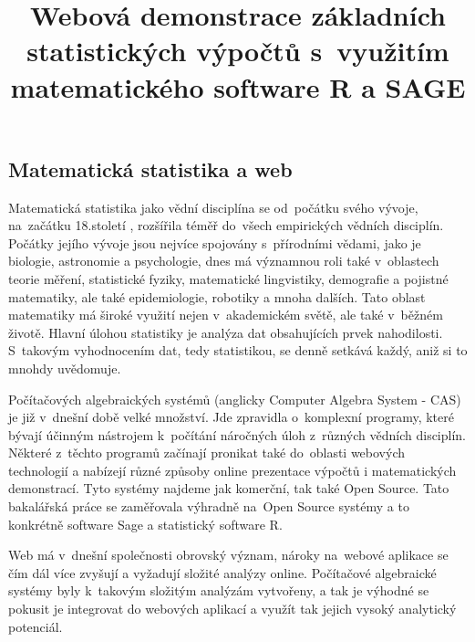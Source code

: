 \documentclass[thesis=B,czech]{FITthesis}[2012/06/26]
\title{Webová demonstrace základních statistických výpočtů s~využitím matematického software R a SAGE}
\begin{document}

\begin{introduction}
\subsection{Matematická statistika a web}
Matematická statistika jako vědní disciplína se od~počátku svého vývoje, na~začátku 18.století \cite{statistika}, rozšířila téměř do~všech empirických vědních disciplín. Počátky jejího vývoje jsou nejvíce spojovány s~přírodními vědami, jako je biologie, astronomie a psychologie, dnes má významnou roli také v~oblastech teorie měření, statistické fyziky, matematické lingvistiky, demografie a pojistné matematiky, ale také epidemiologie, robotiky a mnoha dalších. Tato oblast matematiky má široké využití nejen v~akademickém světě, ale také v~běžném životě. Hlavní úlohou statistiky je analýza dat obsahujících prvek nahodilosti. S~takovým vyhodnocením dat, tedy statistikou, se denně setkává každý, aniž si to mnohdy uvědomuje.  

Počítačových algebraických systémů (anglicky Computer Algebra System - CAS) je již v~dnešní době velké množství. Jde zpravidla o~komplexní programy, které bývají účinným nástrojem k~počítání náročných úloh z~různých vědních disciplín. Některé z~těchto programů začínají pronikat také do~oblasti webových technologií a nabízejí různé způsoby online prezentace výpočtů i matematických demonstrací. Tyto systémy najdeme jak komerční, tak také Open Source. Tato bakalářská práce se zaměřovala výhradně na~Open Source systémy a to konkrétně software Sage a statistický software R.

Web má v~dnešní společnosti obrovský význam, nároky na~webové aplikace se čím dál více zvyšují a vyžadují složité analýzy online. Počítačové algebraické systémy byly k~takovým složitým analýzám vytvořeny, a tak je výhodné se pokusit je integrovat do webových aplikací a využít tak jejich vysoký analytický potenciál. 


\end{introduction}
\end{document}
